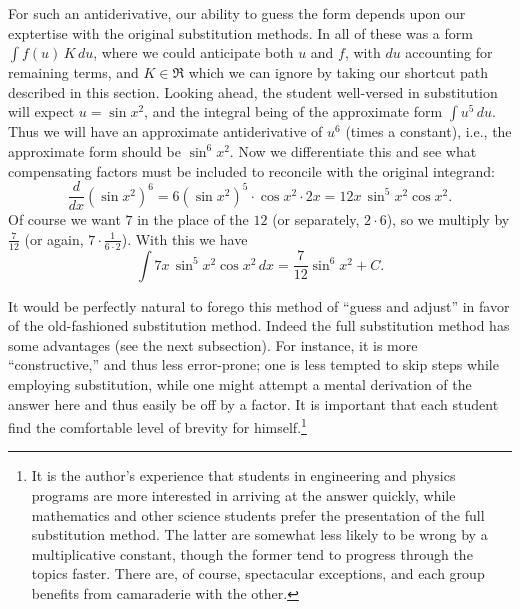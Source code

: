 For such an antiderivative, our ability to guess the form 
depends upon our exptertise with the original substitution
methods.  In all of these was a form $\int f(u)\,K\,du$,
where we could anticipate both $u$ and $f$, with $du$
accounting for remaining terms, and $K\in\Re$
which we can ignore by taking our shortcut path
described in this section.  Looking ahead, the student well-versed
in substitution will expect $u=\sin x^2$, and the integral
being of the approximate form $\int u^5\,du$.  Thus we will
have an approximate antiderivative of $u^6$ (times a constant),
i.e., the approximate form should be $\sin^6x^2$.  Now we differentiate
this and see what compensating factors must be included
to reconcile with the original integrand:\footnotemark
$$\frac{d}{dx}(\sin x^2)^6
=6(\sin x^2)^5\cdot \cos x^2\cdot 2x
=12x\,\sin^5x^2\cos x^2.$$
Of course we want $7$ in the place of the $12$ (or separately,
$2\cdot6$), so we multiply
by $\frac7{12}$ (or again, $7\cdot\frac1{6\cdot2}$).  With this we have
$$\int7x\,\sin^5x^2\cos x^2\,dx=\frac7{12}\sin^6x^2+C.$$
\eex
{}


It would be perfectly natural to forego this method of ``guess and
adjust'' in favor of the old-fashioned substitution method.
Indeed the full substitution method has some advantages (see the next
subsection).  For instance, it
is more ``constructive,'' and thus
less error-prone; one is less tempted to skip steps
while employing substitution, while one might 
attempt a mental derivation of the answer here and
thus easily be off by a factor.  
It is important that each student find the comfortable
level of brevity for himself.\footnote{%
It is the author's experience that students in engineering
and physics programs are more interested in arriving at the
answer quickly, while mathematics and other science students prefer the
presentation of the full substitution method.  The latter
are somewhat less likely to be wrong by a multiplicative
constant, though the former tend to progress through the
topics faster.  There are, of course, spectacular exceptions,
and each group benefits from camaraderie with the other.
}



